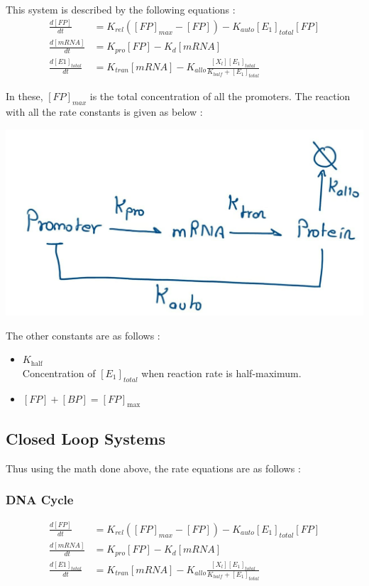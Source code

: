 \noindent This system is described by the following equations :
\begin{align*}
    \frac{d[FP]}{dt} &= K_{rel}([FP]_{max} - [FP]) - K_{auto}[E_1]_{total}[FP]\\
    \frac{d[mRNA]}{dt} &= K_{pro}[FP] - K_d[mRNA]\\
    \frac{d[E1]_{total}}{dt} &= K_{tran}[mRNA] - K_{allo}\frac{[X_l][E_1]_{total}}{K_{half} + [E_1]_{total}}
\end{align*}

\noindent In these, $[FP]_{max}$ is the total concentration of 
all the promoters. 
\newpage
The reaction with all the rate constants is given as below :

\begin{center}
    \includegraphics[scale=0.3]{img/eqn-rate.jpg}
\end{center}

\noindent The other constants are as follows :
\begin{itemize}
    \item $K_{\text{half}}$ \\ \indent Concentration of $[E_1]_{total}$ when reaction rate is half-maximum.
    \item $[FP] + [BP] = [FP]_{\text{max}}$
\end{itemize}

\subsection*{Closed Loop Systems}
Thus using the math done above, the rate equations are 
as follows :

\subsubsection*{DNA Cycle}
\begin{align*}
    \frac{d[FP]}{dt} &= K_{rel}([FP]_{max} - [FP]) - K_{auto}[E_1]_{total}[FP]\\
    \frac{d[mRNA]}{dt} &= K_{pro}[FP] - K_d[mRNA]\\
    \frac{d[E1]_{total}}{dt} &= K_{tran}[mRNA] - K_{allo}\frac{[X_l][E_1]_{total}}{K_{half} + [E_1]_{total}}
\end{align*}

